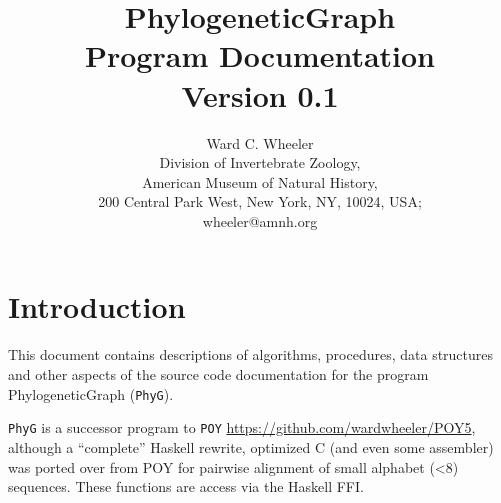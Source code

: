 \documentclass[11pt]{article}
\begin{document}
	
	\title{PhylogeneticGraph\\Program Documentation\\Version 0.1}
	\author{Ward C. Wheeler\\
		Division of Invertebrate Zoology,\\ American Museum of Natural History,\\ 200 Central Park West, New York, NY, 10024, USA;\\wheeler@amnh.org}
	
	
	\maketitle
	\newpage
	
	\tableofcontents
	\newpage
	\section{Introduction}
	This document contains descriptions of algorithms, procedures, data structures and other aspects of the 
	source code documentation for the program PhylogeneticGraph (\texttt{PhyG}).  
	
	 \texttt{PhyG} is a successor program to \texttt{POY} \citep{POY2,POY3,POY4,Varonetal2010,POY5, Wheeleretal2015} \url{https://github.com/wardwheeler/POY5}, 
	 although a ``complete'' Haskell rewrite, optimized C (and even some assembler) was ported over from POY for pairwise alignment of small alphabet (<8)
	 sequences.  These functions are access via the Haskell FFI.
	
	
	
\end{document}
